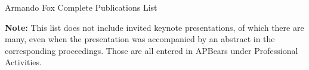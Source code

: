 \documentclass[10pt]{article}
\begin{document}
\pagestyle{empty}\thispagestyle{empty}

\begin{center}{\huge Armando Fox Complete Publications List}
\end{center}
\vspace{0.5in}

\noindent\textbf{Note:} This list does not include invited keynote presentations, of which there are many,
even when the presentation was accompanied by an abstract in the corresponding proceedings.
Those are all entered in APBears under Professional Activities.

\nocite{*}


\printbibliography[type=article,notkeyword=nonref,title={Refereed Journal Articles}]

\printbibliography[type=inproceedings,title={Refereed Conference Proceedings}]

\printbibliography[keyword=nonref,title={Nonrefereed Conference Proceedings}]

\printbibliography[type=report,title={Technical Reports}]

\printbibliography[keyword=booksandbookchapters,title={Books/book chapters}]

\printbibliography[type=patent,title={Patents}]
\end{document}
